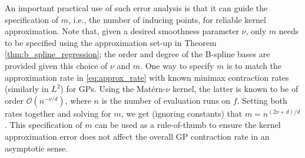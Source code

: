 \documentclass[aos,preprint]{imsart}
\theoremstyle{plain}
\newcommand{\CalX}{\mathcal X}
\newcommand{\CalP}{\mathcal P}
\newcommand{\Bx}{\bold x}
\theoremstyle{remark}
\begin{document}
An important practical use of such error analysis is that it can guide the specification of $m$, i.e., the number of inducing points, for reliable kernel approximation. Note that, given a desired smoothness parameter $\nu$, only $m$ needs to be specified using the approximation set-up in Theorem \ref{thm:b_spline_regression}; the order and degree of the B-spline bases are provided given this choice of $\nu$ and $m$. One way to specify $m$ is to match the approximation rate in \eqref{eq:approx_rate} with known minimax contraction rates (similarly in $L^2$) for GPs. Using the Mat\'ern-$\nu$ kernel, the latter is known to be of order $\mathcal{O}(n^{-\nu/d})$, where $n$ is the number of evaluation runs on $f$. Setting both rates together and solving for $m$, we get (ignoring constants) that $m = n^{(2\nu+d)/d}$. This specification of $m$ can be used as a rule-of-thumb to ensure the kernel approximation error does not affect the overall GP contraction rate in an asymptotic sense.








\end{document}

